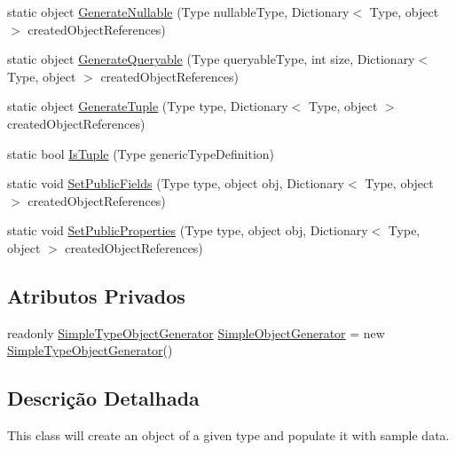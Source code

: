 \begin{DoxyCompactItemize}
\item 
static object \hyperlink{classApi3Layers_1_1Areas_1_1HelpPage_1_1ObjectGenerator_a3becc3691d8e4b6ba3511d1e90dd9a2f}{Generate\+Nullable} (Type nullable\+Type, Dictionary$<$ Type, object $>$ created\+Object\+References)
\item 
static object \hyperlink{classApi3Layers_1_1Areas_1_1HelpPage_1_1ObjectGenerator_ae28b224868a4a0d541b607b41d6c7847}{Generate\+Queryable} (Type queryable\+Type, int size, Dictionary$<$ Type, object $>$ created\+Object\+References)
\item 
static object \hyperlink{classApi3Layers_1_1Areas_1_1HelpPage_1_1ObjectGenerator_a13950cc161b6ba34b1fc38a05fe5ebfe}{Generate\+Tuple} (Type type, Dictionary$<$ Type, object $>$ created\+Object\+References)
\item 
static bool \hyperlink{classApi3Layers_1_1Areas_1_1HelpPage_1_1ObjectGenerator_aa0a1cd58178eb65521e3cc733dbd61b5}{Is\+Tuple} (Type generic\+Type\+Definition)
\item 
static void \hyperlink{classApi3Layers_1_1Areas_1_1HelpPage_1_1ObjectGenerator_a0ae16743b5945dd748ee0cda2ff7938e}{Set\+Public\+Fields} (Type type, object obj, Dictionary$<$ Type, object $>$ created\+Object\+References)
\item 
static void \hyperlink{classApi3Layers_1_1Areas_1_1HelpPage_1_1ObjectGenerator_af71c066c5d2e37f52d0fe9cae1fb8d58}{Set\+Public\+Properties} (Type type, object obj, Dictionary$<$ Type, object $>$ created\+Object\+References)
\end{DoxyCompactItemize}
\subsection*{Atributos Privados}
\begin{DoxyCompactItemize}
\item 
readonly \hyperlink{classApi3Layers_1_1Areas_1_1HelpPage_1_1ObjectGenerator_1_1SimpleTypeObjectGenerator}{Simple\+Type\+Object\+Generator} \hyperlink{classApi3Layers_1_1Areas_1_1HelpPage_1_1ObjectGenerator_adf5706e3413d61502948d1da23f51f44}{Simple\+Object\+Generator} = new \hyperlink{classApi3Layers_1_1Areas_1_1HelpPage_1_1ObjectGenerator_1_1SimpleTypeObjectGenerator}{Simple\+Type\+Object\+Generator}()
\end{DoxyCompactItemize}


\subsection{Descrição Detalhada}
This class will create an object of a given type and populate it with sample data. 



